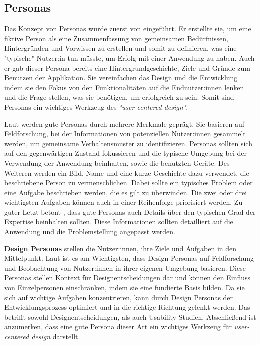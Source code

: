 \subsection{Personas}
Das Konzept von Personas wurde zuerst von \textcite{cooperInmatesAre1999} eingeführt. Er erstellte sie, um eine fiktive Person als eine Zusammenfassung von gemeinsamen Bedürfnissen, Hintergründen und Vorwissen zu erstellen und somit zu definieren, was eine "typische" Nutzer:in tun müsste, um Erfolg mit einer Anwendung zu haben. Auch er gab dieser Persona bereits eine Hintergrundgeschichte, Ziele und Gründe zum Benutzen der Applikation. Sie vereinfachen das Design und die Entwicklung indem sie den Fokus von den Funktionalitäten auf die Endnutzer:innen lenken und die Frage stellen, was sie benötigen, um erfolgreich zu sein. Somit sind Personas ein wichtiges Werkzeug des \textit{"user-centered design"}.
\parencite{cooperInmatesAre1999, tomlinUXOptimization2018}

Laut \textcite{tomlinUXOptimization2018} werden gute Personas durch mehrere Merkmale geprägt. Sie basieren auf Feldforschung, bei der Informationen von potenziellen Nutzer:innen gesammelt werden, um gemeinsame Verhaltensmuster zu identifizieren. Personas sollten sich auf den gegenwärtigen Zustand fokussieren und die typische Umgebung bei der Verwendung der Anwendung beinhalten, sowie die benutzten Geräte. Des Weiteren werden ein Bild, Name und eine kurze Geschichte dazu verwendet, die beschriebene Person zu vermenschlichen. Dabei sollte ein typisches Problem oder eine Aufgabe beschrieben werden, die es gilt zu überwinden. Die zwei oder drei wichtigsten Aufgaben können auch in einer Reihenfolge priorisiert werden. Zu guter Letzt betont \textcite{tomlinUXOptimization2018}, dass gute Personas auch Details über den typischen Grad der Expertise beinhalten sollten. Diese Informationen sollten detailliert auf die Anwendung und die Problemstellung angepasst werden.
\parencite{tomlinUXOptimization2018}


\textbf{Design Personas} stellen die Nutzer:innen, ihre Ziele und Aufgaben in den Mittelpunkt. Laut \textcite{tomlinUXOptimization2018} ist es am Wichtigsten, dass Design Personas auf Feldforschung und Beobachtung von Nutzer:innen in ihrer eigenen Umgebung basieren. Diese Personas stellen Kontext für Designentscheidungen dar und können den Einfluss von Einzelpersonen einschränken, indem sie eine fundierte Basis bilden.  Da sie sich auf wichtige Aufgaben konzentrieren, kann durch Design Personas der Entwicklungsprozess optimiert und in die richtige Richtung gelenkt werden. Das betrifft sowohl Designentscheidungen, als auch Usability Studien. Abschließend ist anzumerken, dass eine gute Persona dieser Art ein wichtiges Werkzeug für \textit{user-centered design} darstellt.
\parencite{tomlinUXOptimization2018}

